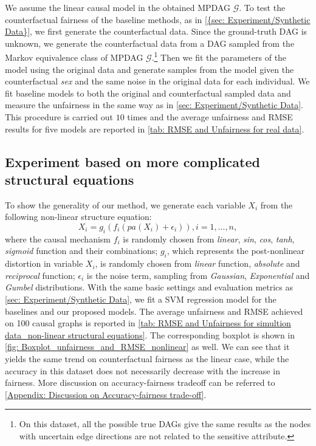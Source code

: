 \documentclass{article}
\begin{document}
We assume the linear causal model in the obtained MPDAG $\mathcal{G}$. To test the counterfactual fairness of the baseline methods, as in \cref{{sec: Experiment/Synthetic Data}}, we first generate the counterfactual data. Since the ground-truth DAG is unknown, we generate the counterfactual data from a DAG sampled from the Markov equivalence class of MPDAG $\mathcal{G}$.\footnote{On this dataset, all the possible true DAGs give the same results as the nodes with uncertain edge directions are not related to the sensitive attribute.} Then we fit the parameters of the model using the original data and generate samples from the model given the counterfactual \textit{sex} and the same noise in the original data for each individual. We fit baseline models to both the original and counterfactual sampled data and measure the unfairness in the same way as in \cref{sec: Experiment/Synthetic Data}. This procedure is carried out $10$ times and the average unfairness and RMSE results for five models are reported in \cref{tab: RMSE and Unfairness for real data}.


\subsection{Experiment based on more complicated structural equations} \label{Appendix: Experiment based on non-linear structural equations}

To show the generality of our method, we generate each variable $X_i$ from the following non-linear structure equation:
\begin{equation} \label{eq: nonlinear structual equation model}
    X_i = g_i(f_i(pa(X_i)+\epsilon_i)), i=1,...,n,
\end{equation}
where the causal mechanism $f_i$ is randomly chosen from \textit{linear}, \textit{sin}, \textit{cos}, \textit{tanh}, \textit{sigmoid} function and their combinations; $g_i$, which represents the post-nonlinear distortion in variable $X_i$, is randomly chosen from \textit{linear} function, \textit{absolute} and \textit{reciprocal} function; $\epsilon_i$ is the noise term, sampling from \textit{Gaussian}, \textit{Exponential} and \textit{Gumbel} distributions. With the same basic settings and evaluation metrics as \cref{sec: Experiment/Synthetic Data}, we fit a SVM regression model for the baselines and our proposed models. The average unfairness and RMSE achieved on 100 causal graphs is reported in \cref{tab: RMSE and Unfairness for simultion data_non-linear structural equations}. The corresponding boxplot is shown in \cref{fig: Boxplot_unfairness_and_RMSE_nonlinear} as well. We can see that it yields the same trend on counterfactual fairness as the linear case, while the accuracy in this dataset does not necessarily decrease with the increase in fairness. More discussion on accuracy-fairness tradeoff can be referred to \cref{Appendix: Discussion on Accuracy-fairness trade-off}.
\end{document}
